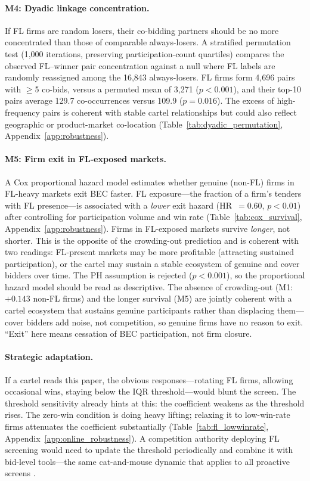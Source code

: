 

\paragraph{M4: Dyadic linkage concentration.}
If FL firms are random losers, their co-bidding partners should be
no more concentrated than those of comparable always-losers. A
stratified permutation test (1,000 iterations, preserving
participation-count quartiles) compares the observed FL--winner pair
concentration against a null where FL labels are randomly reassigned
among the 16,843 always-losers. FL firms form 4,696 pairs with
$\geq$5 co-bids, versus a permuted mean of 3,271 ($p < 0.001$), and
their top-10 pairs average 129.7 co-occurrences versus 109.9
($p = 0.016$). The excess of high-frequency pairs is coherent with
stable cartel relationships but could also reflect geographic or
product-market co-location
(Table~\ref{tab:dyadic_permutation}, Appendix~\ref{app:robustness}).

\paragraph{M5: Firm exit in FL-exposed markets.}
A Cox proportional hazard model estimates whether genuine (non-FL)
firms in FL-heavy markets exit BEC faster. FL exposure---the fraction
of a firm's tenders with FL presence---is associated with a
\emph{lower} exit hazard (HR~$= 0.60$, $p < 0.01$) after controlling
for participation volume and win rate
(Table~\ref{tab:cox_survival}, Appendix~\ref{app:robustness}).
Firms in FL-exposed markets survive \emph{longer}, not shorter. This
is the opposite of the crowding-out prediction and is coherent with
two readings: FL-present markets may be more profitable (attracting
sustained participation), or the cartel may sustain a stable
ecosystem of genuine and cover bidders over time. The PH assumption
is rejected ($p < 0.001$), so the proportional hazard model should
be read as descriptive.
The absence of crowding-out (M1: $+0.143$ non-FL firms) and the
longer survival (M5) are jointly coherent with a cartel ecosystem
that sustains genuine participants rather than displacing them---cover
bidders add noise, not competition, so genuine firms have no reason
to exit. ``Exit'' here means cessation of BEC participation, not
firm closure.

\paragraph{Strategic adaptation.}
If a cartel reads this paper, the obvious responses---rotating FL
firms, allowing occasional wins, staying below the IQR threshold---would blunt the screen. The threshold sensitivity already hints at
this: the coefficient weakens as the threshold rises. The zero-win
condition is doing heavy lifting; relaxing it to low-win-rate firms
attenuates the coefficient substantially
(Table~\ref{tab:fl_lowwinrate},
Appendix~\ref{app:online_robustness}). A competition authority
deploying FL screening would need to update the threshold periodically
and combine it with bid-level tools---the same cat-and-mouse dynamic
that applies to all proactive screens
\citep{harrington2008detecting}.


